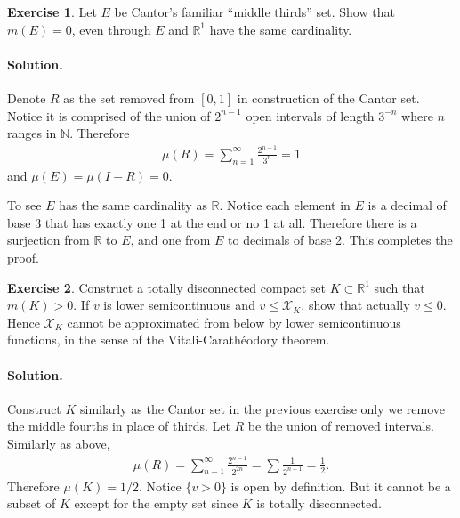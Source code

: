 \documentclass[10pt,a4paper]{book}
\theoremstyle{definition}
\newtheorem{exercise}{Exercise}[chapter]
\newcommand{\R}{\mathbb R}
\begin{document}
	\begin{exercise}
		Let $ E $ be Cantor's familiar ``middle thirds'' set. Show that $ m(E) = 0 $, even through $ E $ and $ \R ^{1}  $ have the same cardinality.
		\paragraph{Solution. }
		Denote $ R $ as the set removed from $ [0, 1] $ in construction of the Cantor set. Notice it is comprised of the union of $ 2 ^{n-1} $ open intervals of length $ 3 ^{-n} $ where $ n $ ranges in $ \mathbb{N} $. Therefore
		\begin{align*}
			\mu(R) = \sum_{n=1}^{\infty} \frac {2 ^{n-1}}{3^n} = 1
		\end{align*}
		and $ \mu(E) = \mu(I - R) = 0 $.

		To see $ E $ has the same cardinality as $ \R $. Notice each element in $ E $ is a decimal of base 3 that has exactly one 1 at the end or no 1 at all. Therefore there is a surjection from $ \R $ to $ E $, and one from $ E $ to decimals of base 2. This completes the proof.

	\end{exercise}

	\begin{exercise}
		Construct a totally disconnected compact set $ K \subset \R^1 $ such that $ m(K) > 0 $. If $ v $ is lower semicontinuous and $ v \le \mathcal{X}_K $, show that actually $ v \le 0 $. Hence $ \mathcal{X}_K $ cannot be approximated from below by lower semicontinuous functions, in the sense of the Vitali-Carath\'eodory theorem.
		\paragraph{Solution. }
		Construct $ K $ similarly as the Cantor set in the previous exercise only we remove the middle fourths in place of thirds. Let $ R $ be the union of removed intervals. Similarly as above,
		\begin{align*}
			\mu(R) = \sum_{n-1}^{\infty} \frac {2 ^{n-1} }{2 ^{2n} } = \sum \frac {1}{2 ^{n+1} } = \frac {1}{2} .
		\end{align*}
		Therefore $ \mu(K) = 1/2 $. Notice $ \{v > 0\} $ is open by definition. But it cannot be a subset of $ K $ except for the empty set since $ K $ is totally disconnected.

	\end{exercise}
\end{document}
